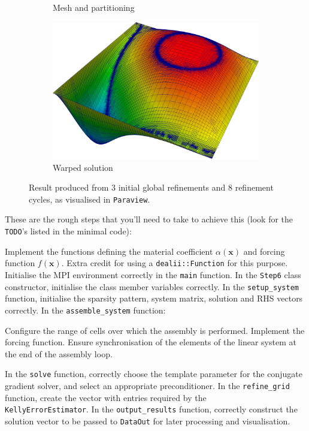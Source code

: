 \documentclass[11pt]{exam}
\begin{document}
\begin{questions}
\begin{parts}
\begin{figure}[!h]
\begin{subfigure}[t]{0.475\textwidth}
\caption{Mesh and partitioning}
\end{subfigure}
\quad
\begin{subfigure}[t]{0.475\textwidth}
\centering
\includegraphics[height=0.225\textheight]{Figures/lab_07_08-solution.png}
\caption{Warped solution}
\end{subfigure}
\caption{Result produced from 3 initial global refinements and 8 refinement cycles, as visualised in \texttt{Paraview}.}
\end{figure}
\clearpage
These are the rough steps that you'll need to take to achieve this (look for the \verb|TODO|'s listed in the minimal code):
\begin{subparts}
\subpart Implement the functions defining the material coefficient $\alpha(\mathbf{x})$ and forcing function $f(\mathbf{x})$.
Extra credit for using a \verb|dealii::Function| for this purpose.
\subpart Initialise the MPI environment correctly in the \verb|main| function.
\subpart In the \verb|Step6| class constructor, initialise the class member variables correctly.
\subpart In the \verb|setup_system| function, initialise the sparsity pattern, system matrix, solution and RHS vectors correctly.
\subpart In the \verb|assemble_system| function:
\begin{subsubparts}
\subsubpart Configure the range of cells over which the assembly is performed.
\subsubpart Implement the forcing function.
\subsubpart Ensure synchronisation of the elements of the linear system at the end of the assembly loop.
\end{subsubparts}
\subpart In the \verb|solve| function, correctly choose the template parameter for the conjugate gradient solver, and select an appropriate preconditioner.
\subpart In the \verb|refine_grid| function, create the vector with entries required by the\\ \verb|KellyErrorEstimator|.
\subpart In the \verb|output_results| function, correctly construct the solution vector to be passed to \verb|DataOut| for later processing and visualisation.
\end{subparts}

\end{parts}
\end{questions}
\end{document}
